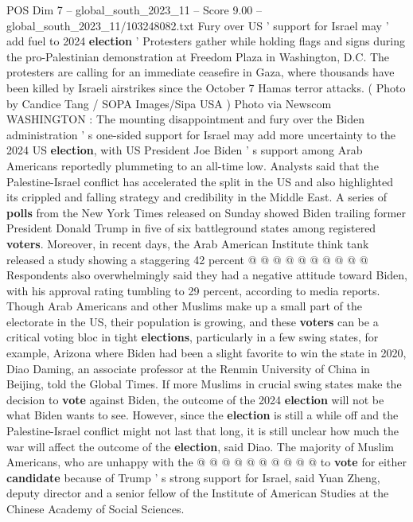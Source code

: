 \begin{textsample}{POS Dim 7 – global\_south\_2023\_11 – Score 9.00 – global\_south\_2023\_11/103248082.txt}  \label{ex:f7_pos_297}
Fury over US ' support for Israel may ' add fuel to 2024 \textbf{election} ' Protesters gather while holding flags and signs during the pro-Palestinian demonstration at Freedom Plaza in Washington, D.C.
The protesters are calling for an immediate ceasefire in Gaza, where thousands have been killed by Israeli airstrikes since the October 7 Hamas terror attacks. ( Photo by Candice Tang / SOPA Images/Sipa USA ) Photo via Newscom WASHINGTON : The mounting disappointment and fury over the Biden administration ' s one-sided support for Israel may add more uncertainty to the 2024 US \textbf{election}, with US President Joe Biden ' s support among Arab Americans reportedly plummeting to an all-time low.
Analysts said that the Palestine-Israel conflict has accelerated the split in the US and also highlighted its crippled and falling strategy and credibility in the Middle East.
A series of \textbf{polls} from the New York Times released on Sunday showed Biden trailing former President Donald Trump in five of six battleground states among registered \textbf{voters}.
Moreover, in recent days, the Arab American Institute think tank released a study showing a staggering 42 percent @ @ @ @ @ @ @ @ @ @ Respondents also overwhelmingly said they had a negative attitude toward Biden, with his approval rating tumbling to 29 percent, according to media reports.
Though Arab Americans and other Muslims make up a small part of the electorate in the US, their population is growing, and these \textbf{voters} can be a critical voting bloc in tight \textbf{elections}, particularly in a few swing states, for example, Arizona where Biden had been a slight favorite to win the state in 2020, Diao Daming, an associate professor at the Renmin University of China in Beijing, told the Global Times.
If more Muslims in crucial swing states make the decision to \textbf{vote} against Biden, the outcome of the 2024 \textbf{election} will not be what Biden wants to see.
However, since the \textbf{election} is still a while off and the Palestine-Israel conflict might not last that long, it is still unclear how much the war will affect the outcome of the \textbf{election}, said Diao.
The majority of Muslim Americans, who are unhappy with the @ @ @ @ @ @ @ @ @ @ to \textbf{vote} for either \textbf{candidate} because of Trump ' s strong support for Israel, said Yuan Zheng, deputy director and a senior fellow of the Institute of American Studies at the Chinese Academy of Social Sciences.

\end{textsample}
